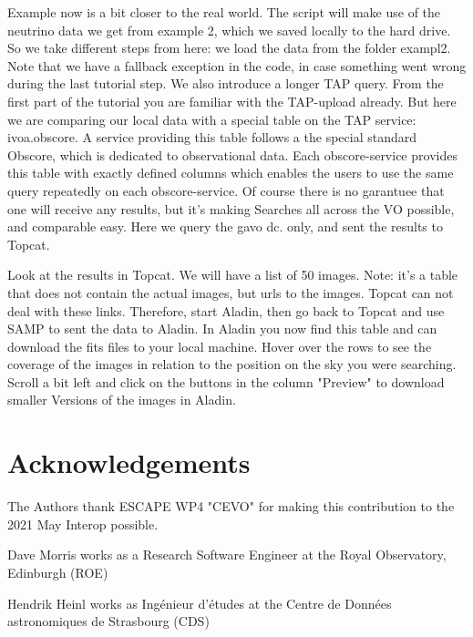 \documentclass[twoside]{article}[12pt]
\begin{document}
\SAMP


Example now is a bit closer to the real world. The script will make use
of the neutrino data we get from example 2, which we saved locally to
the hard drive. So we take different steps from here: we load the data
from the folder exampl2. Note that we have a fallback exception in the
code, in case something went wrong during the last tutorial step. We
also introduce a longer TAP query. From the first part of the tutorial
you are familiar with the TAP-upload already. But here we are comparing
our local data with a special table on the TAP service: ivoa.obscore. 
A service providing this table follows a the special standard Obscore,
which is dedicated to observational data. Each obscore-service provides
this table with exactly defined columns which enables the users to use
the same query repeatedly on each obscore-service. Of course there is no
garantuee that one will receive any results, but it's making Searches
all across the VO possible, and comparable easy. Here we query the gavo
dc. only, and sent the results to Topcat. 

\OBSCORE


Look at the results in Topcat. We will have a list of 50 images. Note:
it's a table that does not contain the actual images, but urls to the
images. Topcat can not deal with these links. Therefore, start Aladin,
then go back to Topcat and use SAMP to sent the data to Aladin. 
In Aladin you now find this table and can download the fits files to
your local machine. Hover over the rows to see the coverage of the
images in relation to the position on the sky you were searching. 
Scroll a bit left and click on the buttons in the column "Preview" to
download smaller Versions of the images in Aladin. 





\section {Acknowledgements}
The Authors thank ESCAPE WP4 "CEVO" for making this contribution to the
2021 May Interop possible. 

Dave Morris works as a Research Software Engineer at the Royal Observatory,
Edinburgh (ROE)

Hendrik Heinl works as Ingénieur d'études at the Centre de Données
astronomiques de Strasbourg (CDS)
\end{document}

